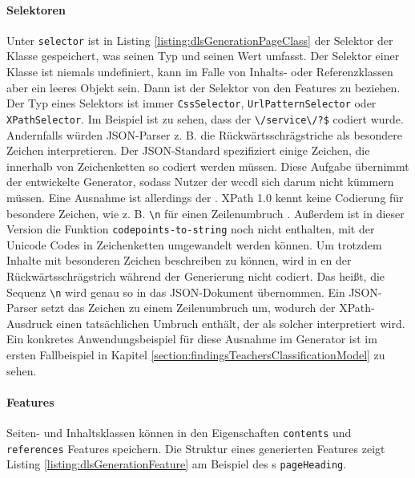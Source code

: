     \paragraph{Selektoren}
    Unter \texttt{selector} ist in Listing \ref{listing:dlsGenerationPageClass}
    der Selektor der Klasse gespeichert,
    was seinen Typ und seinen Wert umfasst.
    Der Selektor einer Klasse ist niemals undefiniert,
    kann im Falle von Inhalts- oder Referenzklassen aber ein leeres Objekt sein.
    Dann ist der Selektor von den Features zu beziehen.
    Der Typ eines Selektors ist immer \texttt{CssSelector},
    \texttt{UrlPatternSelector} oder \texttt{XPathSelector}.
    Im Beispiel ist zu sehen, dass der {\urlSelector} \verb+\/service\/?$+ codiert wurde.
    Andernfalls würden JSON-Parser z. B. die Rückwärtsschrägstriche als besondere Zeichen interpretieren.
    Der JSON-Standard \cite[Kapitel 7]{rfc:8259} spezifiziert einige Zeichen,
    die innerhalb von Zeichenketten so codiert werden müssen.
    Diese Aufgabe übernimmt der entwickelte Generator,
    sodass Nutzer der \gls{wccdl} sich darum nicht kümmern müssen.
    Eine Ausnahme ist allerdings der {\xpathSelector}.
    XPath 1.0 kennt keine Codierung für besondere Zeichen,
    wie z. B. \texttt{\textbackslash{n}} für einen Zeilenumbruch \cite{w3c:xpath}.
    Außerdem ist in dieser Version die Funktion
    \texttt{codepoints-to-string} \cite[Kapitel 5.2.1]{w3c:xpathXquery} noch nicht enthalten,
    mit der Unicode Codes in Zeichenketten umgewandelt werden können.
    Um trotzdem Inhalte mit besonderen Zeichen beschreiben zu können,
    wird in {\xpathSelector}en der Rückwärtsschrägstrich während der
    Generierung nicht codiert.
    Das heißt, die Sequenz \texttt{\textbackslash{n}} wird genau so in das JSON-Dokument übernommen.
    Ein JSON-Parser setzt das Zeichen zu einem Zeilenumbruch um,
    wodurch der XPath-Ausdruck einen tatsächlichen Umbruch enthält,
    der als solcher interpretiert wird.
    Ein konkretes Anwendungsbeispiel für diese Ausnahme im Generator
    ist im ersten Fallbeispiel in Kapitel \ref{section:findingsTeachersClassificationModel} zu sehen.

    \paragraph{Features}
    Seiten- und Inhaltsklassen können in den Eigenschaften
    \texttt{contents} und \texttt{references} Features speichern.
    Die Struktur eines generierten Features zeigt Listing
    \ref{listing:dlsGenerationFeature} am Beispiel des {\contentFeature}s \texttt{pageHeading}.


